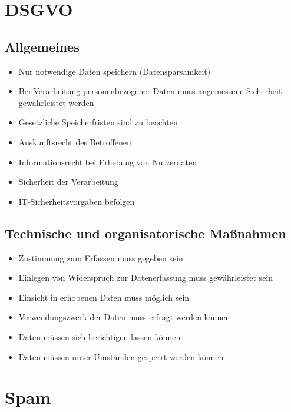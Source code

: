 \section{DSGVO}

\subsection{Allgemeines}
\begin{frame}
\begin{itemize}
	\item Nur notwendige Daten speichern (Datensparsamkeit)
	\item Bei Verarbeitung personenbezogener Daten muss angemessene Sicherheit gewährleistet werden
	\item Gesetzliche Speicherfristen sind zu beachten
	\item Auskunftsrecht des Betroffenen
	\item Informationsrecht bei Erhebung von Nutzerdaten
	\item Sicherheit der Verarbeitung
	\item IT-Sicherheitsvorgaben befolgen
\end{itemize}
\end{frame}

\subsection{Technische und organisatorische Maßnahmen}
\begin{frame}
\begin{itemize}
	\item Zustimmung zum Erfassen muss gegeben sein
	\item Einlegen von Widerspruch zur Datenerfassung muss gewährleistet sein
	\item Einsicht in erhobenen Daten muss möglich sein
	\item Verwendungszweck der Daten muss erfragt werden können
	\item Daten müssen sich berichtigen lassen können
	\item Daten müssen unter Umständen gesperrt werden können
\end{itemize}
\end{frame}

\section{Spam}

